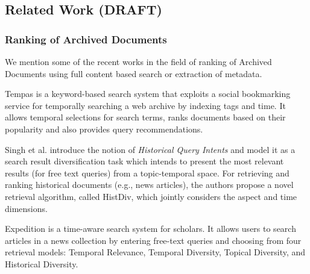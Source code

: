 
\subsection{Related Work (DRAFT)}
\label{rw}

\subsubsection{Ranking of Archived Documents}
\label{arc_doc_ranking}
We mention some of the recent works in the
field of ranking of Archived Documents
using full content based search
or extraction of metadata.

Tempas \cite{holzmann2016tempas}
is a keyword-based search system that exploits a social bookmarking service for
temporally searching a web archive by indexing tags and time.
It allows temporal selections
for search terms, ranks documents based on their
popularity and also provides query recommendations.

Singh et al.\cite{singh2016history}
introduce the notion of {\em Historical Query Intents}
and model it as a search result diversification task
which intends to present the most relevant results (for free text queries) from a
topic-temporal space.
For retrieving and ranking historical documents (e.g., news articles),
the authors propose a novel retrieval algorithm, called HistDiv,
which jointly considers the aspect and time dimensions.

Expedition \cite{singh2016expedition} is a time-aware
search system for scholars.
It allows users to search articles in a news
collection by entering free-text queries and choosing
from four retrieval models:
Temporal Relevance,
Temporal Diversity,
Topical Diversity, and
Historical Diversity.

